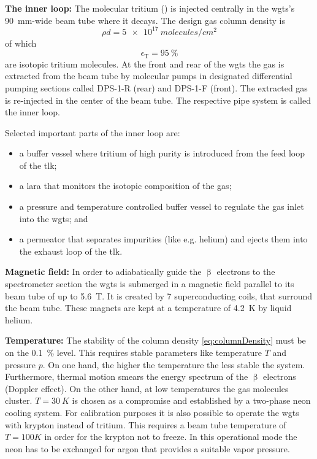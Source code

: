     {\par \textbf{The inner loop:} The molecular tritium () is injected centrally in the \gls{wgts}'s \SI{90}{mm}-wide beam tube where it decays. The design gas column density is 
    \begin{equation}
        \label{eq:columnDensity}
        \rho d = \SI{5e17}{molecules/{cm}^2}
    \end{equation}
    of which \begin{equation}
        \epsilon_\text{T} = \SI{95}{\percent}
    \end{equation}
    are isotopic tritium molecules. At the front and rear of the \gls{wgts} the gas is extracted from the beam tube by molecular pumps in designated differential pumping sections called DPS-1-R (rear) and DPS-1-F (front). The extracted gas is re-injected in the center of the beam tube. The respective pipe system is called the inner loop.
    \begin{samepage}
    Selected important parts of the inner loop are:
    \begin{itemize}
    \renewcommand{\labelitemi}{$\bullet$}
        \item a buffer vessel where tritium of high purity is introduced from the feed loop of the \gls{tlk};
        \item a \gls{lara} that monitors the isotopic composition of the gas;
        \item a pressure and temperature controlled buffer vessel to regulate the gas inlet into the \gls{wgts}; and
        \item a permeator that separates impurities (like e.g. helium) and ejects them into the exhaust loop of the \gls{tlk}.
    \end{itemize}
    \end{samepage}}
    
    
    {\par\textbf{Magnetic field:}
    In order to adiabatically guide the $\upbeta$ electrons to the spectrometer section the \gls{wgts} is submerged in a magnetic field parallel to its beam tube of up to \SI{5.6}{T}. It is created by 7 superconducting coils, that surround the beam tube. These magnets are kept at a temperature of \SI{4.2}{K} by liquid helium.}
    
    {\par\textbf{Temperature:}
    The stability of the column density \eqref{eq:columnDensity} must be on the \SI{0.1}{\percent} level. This requires stable parameters like temperature $T$ and pressure $p$. On one hand, the higher the temperature the less stable the system. Furthermore, thermal motion smears the energy spectrum of the $\upbeta$ electrons (Doppler effect). On the other hand, at low temperatures the gas molecules cluster. $T=\SI{30}{K}$ is chosen as a compromise and established by a two-phase neon cooling system. For calibration purposes it is also possible to operate the \gls{wgts} with krypton instead of tritium. This requires a beam tube temperature of $T=100K$ in order for the krypton not to freeze. In this operational mode the neon has to be exchanged for argon that provides a suitable vapor pressure.}
    
